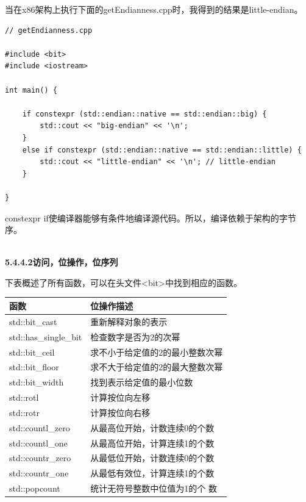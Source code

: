 当在x86架构上执行下面的getEndianness.cpp时，我得到的结果是little-endian。

\begin{lstlisting}[style=styleCXX]
// getEndianness.cpp

#include <bit>
#include <iostream>

int main() {
	
	if constexpr (std::endian::native == std::endian::big) {
		std::cout << "big-endian" << '\n';
	}
	else if constexpr (std::endian::native == std::endian::little) {
		std::cout << "little-endian" << '\n'; // little-endian
	}

}
\end{lstlisting}

constexpr if使编译器能够有条件地编译源代码。所以，编译依赖于架构的字节序。

\hspace*{\fill} \\ %
\noindent
\textbf{5.4.4.2\hspace{0.2cm}访问，位操作，位序列}

下表概述了所有函数，可以在头文件<bit>中找到相应的函数。

\begin{table}[H]
\centering
\begin{tabular}{ll}
\textbf{函数}     & \textbf{位操作描述}                                                             \\ \hline
std::bit\_cast        & 重新解释对象的表示                                           \\ \hline
std::has\_single\_bit & 检查数字是否为2的次幂                                             \\ \hline
std::bit\_ceil        & 求不小于给定值的2的最小整数次幂 \\ \hline
std::bit\_floor       & 求不大于给定值的2的最大整数次幂  \\ \hline
std::bit\_width       & 找到表示给定值的最小位数                   \\ \hline
std::rotl             & 计算按位向左移                                               \\ \hline
std::rotr             & 计算按位向右移                                               \\ \hline
std::countl\_zero     & 从最高位开始，计数连续0的个数      \\ \hline
std::countl\_one      & 从最高位开始，计算连续1的个数      \\ \hline
std::countr\_zero     & 从最低位开始，计数连续0的个数    \\ \hline
std::countr\_one      & 从最低有效位，计算连续1的个数     \\ \hline
std::popcount         & 统计无符号整数中位值为1的个 数                                  \\ \hline
\end{tabular}
\end{table}

